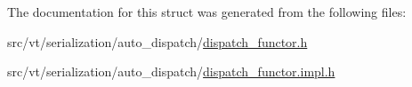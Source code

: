 The documentation for this struct was generated from the following files\+:\begin{DoxyCompactItemize}
\item 
src/vt/serialization/auto\+\_\+dispatch/\hyperlink{dispatch__functor_8h}{dispatch\+\_\+functor.\+h}\item 
src/vt/serialization/auto\+\_\+dispatch/\hyperlink{dispatch__functor_8impl_8h}{dispatch\+\_\+functor.\+impl.\+h}\end{DoxyCompactItemize}
